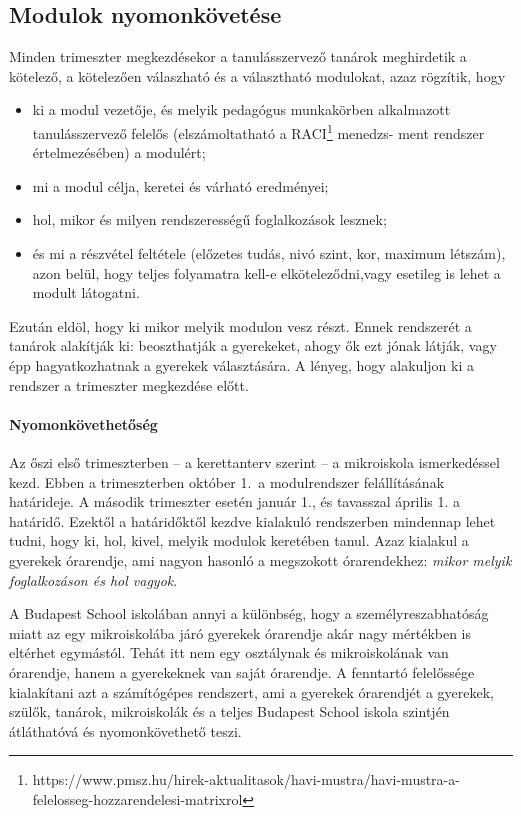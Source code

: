 \subsection{Modulok nyomonkövetése}
Minden trimeszter megkezdésekor a tanulásszervező tanárok meghirdetik a kötelező, a kötelezően válaszható és a választható modulokat, azaz rögzítik, hogy
\begin{itemize}
    \item ki a modul vezetője, és melyik pedagógus munkakörben
      alkalmazott tanulásszervező felelős (elszámoltatható a
      RACI\footnote{https://www.pmsz.hu/hirek-aktualitasok/havi-mustra/havi-mustra-a-felelosseg-hozzarendelesi-matrixrol}
      me\-nedzs-\linebreak
      ment
      rendszer értelmezésében) a modulért;
    \item mi a modul célja, keretei és várható eredményei;
    \item hol, mikor és milyen rendszerességű foglalkozások lesznek;
    \item és mi a részvétel feltétele (előzetes tudás, nivó szint,
      kor, maximum létszám), azon belül, hogy teljes folyamatra kell-e
      elköteleződni,\linebreak vagy esetileg is lehet a modult látogatni.
\end{itemize}
Ezután eldöl, hogy ki mikor  melyik modulon vesz részt. Ennek rendszerét a tanárok alakítják ki: beoszthatják a gyerekeket, ahogy ők ezt jónak látják, vagy épp hagyatkozhatnak a gyerekek választására. A lényeg, hogy alakuljon ki a rendszer a trimeszter megkezdése előtt.

\paragraph{Nyomonkövethetőség}
Az őszi első trimeszterben  -- a kerettanterv szerint -- a mikroiskola ismerkedéssel kezd. Ebben a trimeszterben október 1.~a modulrendszer felállításának határideje. A második trimeszter esetén január 1., és tavasszal április 1. a határidő. Ezektől a határidőktől kezdve kialakuló rendszerben mindennap lehet tudni, hogy ki, hol, kivel, melyik modulok keretében tanul. Azaz kialakul a gyerekek órarendje, ami nagyon hasonló a megszokott órarendekhez: \emph{mikor melyik foglalkozáson és hol vagyok}.

A Budapest School iskolában annyi a különbség, hogy a személyreszabhatóság miatt az egy mikroiskolába járó gyerekek órarendje akár nagy mértékben is eltérhet egymástól. Tehát itt nem egy osztálynak és mikroiskolának van órarendje, hanem a gyerekeknek van saját órarendje. A fenntartó felelőssége kialakítani azt a számítógépes rendszert, ami a gyerekek órarendjét a gyerekek, szülők, tanárok, mikroiskolák és a teljes Budapest School iskola szintjén átláthatóvá és nyomonkövethető teszi.

